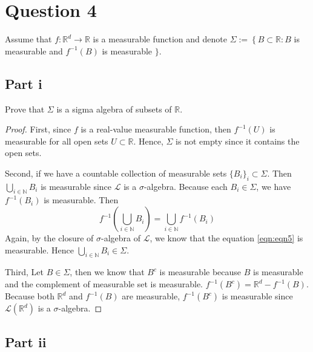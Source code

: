 \section{Question 4}

\begin{question}
    Assume that $f: \mathbb{R}^d \rightarrow \mathbb{R}$ is a measurable function and denote $\Sigma:=\left\{B \subset \mathbb{R}: B\right.$ is measurable and $f^{-1}(B)$ is measurable $\}$.
\end{question}

\subsection{Part i}

\begin{question}
    Prove that $\Sigma$ is a sigma algebra of subsets of $\mathbb{R}$.
\end{question}

\begin{answer}
    \begin{proof}
        First, since $f$ is a real-value measurable function, then $f^{-1}(U)$ is measurable for all open sets $U \subset \mathbb{R}$. Hence, $\Sigma$ is not empty since it contains the open sets.
        
        Second, if we have a countable collection of measurable sets $\{B_i\}_i \subset \Sigma$. Then $\bigcup_{i \in \mathbb{N}} B_i$ is measurable since $\mathcal{L}$ is a $\sigma$-algebra. Because each $B_i \in \Sigma$, we have $f^{-1}(B_i)$ is measurable. Then
        \begin{equation}\label{eqn:eqn5}
            f^{-1}\left(\bigcup_{i \in \mathbb{N}}B_i\right) = \bigcup_{i \in \mathbb{N}}f^{-1}(B_i)
        \end{equation}
        Again, by the closure of $\sigma$-algebra of $\mathcal{L}$, we know that the equation \ref{eqn:eqn5} is measurable. Hence $\bigcup_{i \in \mathbb{N}}B_i \in \Sigma$.
        
        Third, Let $B \in \Sigma$, then we know that $B^c$ is measurable because $B$ is measurable and the complement of measurable set is measurable. $f^{-1}(B^c) = \mathbb{R}^d - f^{-1}(B)$. Because both $\mathbb{R}^d$ and $f^{-1}(B)$ are measurable, $f^{-1}(B^c)$ is measurable since $\mathcal{L}(\mathbb{R}^d)$ is a $\sigma$-algebra.
    \end{proof}
\end{answer}

\subsection{Part ii}


